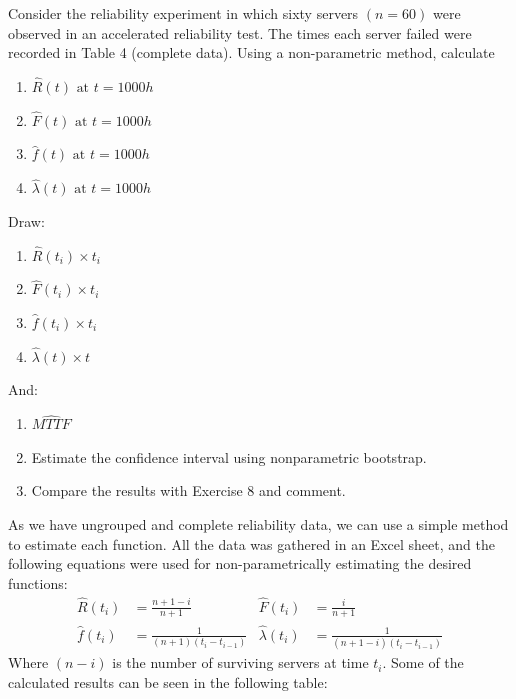 \documentclass{article}
\begin{document}
\setcounter{Question}{8}
\begin{question}
    Consider the reliability experiment in which sixty servers \((n = 60)\) were observed in an accelerated reliability test. The times each server failed were recorded in Table 4 (complete data). Using a non-parametric method, calculate
    \begin{enumerate}[label=(\alph*)]
        \item \(\hat{R}(t) \text{ at } t = 1000h\)
        \item \(\hat{F}(t) \text{ at } t = 1000h\)
        \item \(\hat{f}(t) \text{ at } t = 1000h\)
        \item \(\hat{\lambda}(t) \text{ at } t = 1000h\)
    \end{enumerate}
    Draw:
    \begin{enumerate}[label=(\alph*), start=5]
        \item \(\hat{R}(t_i) \times t_i\)
        \item \(\hat{F}(t_i) \times t_i\)
        \item \(\hat{f}(t_i) \times t_i\)
        \item \(\hat{\lambda}(t) \times t\)
    \end{enumerate}
    And:
    \begin{enumerate}[label=(\alph*), start=9]
        \item \(\widehat{MTTF}\)
        \item Estimate the confidence interval using nonparametric bootstrap.
        \item Compare the results with Exercise 8 and comment.
    \end{enumerate}
\end{question}

As we have ungrouped and complete reliability data, we can use a simple method to estimate each function. All the data was gathered in an Excel sheet, and the following equations were used for non-parametrically estimating the desired functions:
    \begin{align*}
        \hat{R}(t_i) &= \frac{n+1-i}{n+1}    &   \hat{F}(t_i) &= \frac{i}{n+1} \\
        \hat{f}(t_i) &= \frac{1}{(n+1)(t_i - t_{i - 1})}   &   \hat{\lambda}(t_i) &= \frac{1}{(n+1-i)(t_i - t_{i-1})}
    \end{align*}
    Where $(n - i)$ is the number of surviving servers at time $t_i$. Some of the calculated results can be seen in the following table:
\end{document}
